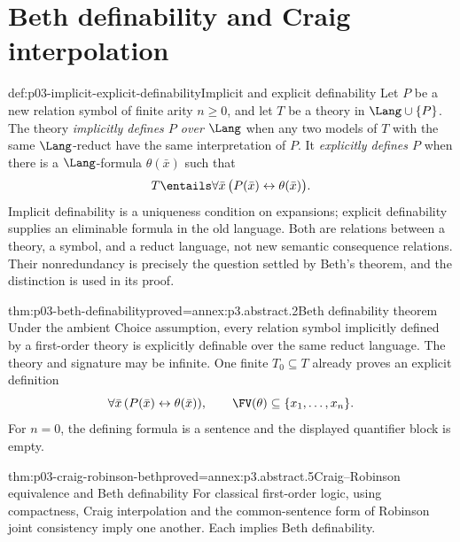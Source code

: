 

\section{Beth definability and Craig interpolation}
\label{sec:p03-beth-craig}

\begin{hbdefinition}{def:p03-implicit-explicit-definability}{Implicit and explicit definability}
Let \(P\) be a new relation symbol of finite arity \(n\geq0\), and let \(T\) be a theory in
\(\Lang\cup\{P\}\).  The theory \emph{implicitly defines \(P\) over
\(\Lang\)} when any two models of \(T\) with the same \(\Lang\)-reduct have
the same interpretation of \(P\).  It \emph{explicitly defines \(P\)} when
there is a \(\Lang\)-formula \(\theta(\bar x)\) such that
\[
 T\entails\forall\bar x\,
   \bigl(P(\bar x)\leftrightarrow\theta(\bar x)\bigr).
\]
Implicit definability is a uniqueness condition on expansions; explicit
definability supplies an eliminable formula in the old language.  Both are
relations between a theory, a symbol, and a reduct language, not new semantic
consequence relations.  Their nonredundancy is precisely the question settled
by Beth's theorem, and the distinction is used in its proof.
\end{hbdefinition}

\begin{hbtheorem}{thm:p03-beth-definability}{proved=annex:p3.abstract.2}{Beth definability theorem}
Under the ambient Choice assumption, every relation symbol implicitly
defined by a first-order theory is explicitly definable over the same
reduct language.  The theory and signature may be infinite.
One finite \(T_0\subseteq T\) already proves an explicit definition
\[
 \forall\bar x\,
       (P(\bar x)\leftrightarrow\theta(\bar x)),
 \qquad \FV(\theta)\subseteq\{x_1,\ldots,x_n\}.
\]
For \(n=0\), the defining formula is a sentence and the displayed
quantifier block is empty.
\end{hbtheorem}

\begin{hbtheorem}{thm:p03-craig-robinson-beth}{proved=annex:p3.abstract.5}{Craig--Robinson equivalence and Beth definability}
For classical first-order logic, using compactness, Craig interpolation
and the common-sentence form of Robinson joint consistency imply one
another.  Each implies Beth definability.
\end{hbtheorem}

